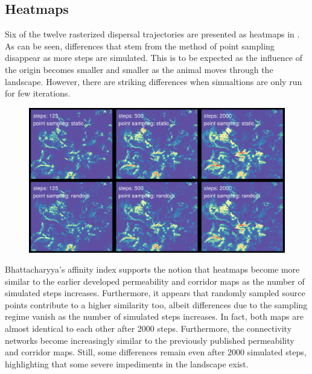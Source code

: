 \documentclass[abstract=on,10pt,a4paper,bibliography=totocnumbered]{article}
\begin{document}
\subsection{Heatmaps}
Six of the twelve rasterized dispersal trajectories are presented as heatmaps in
. As can be seen, differences that stem from the method of point
sampling disappear as more steps are simulated. This is to be expected as the
influence of the origin becomes smaller and smaller as the animal moves through
the landscape. However, there are striking differences when simualtions are only
run for few iterations.

\begin{figure}
  \includegraphics[width=\textwidth]{99_Heatmaps}
  \caption{}
  \label{Heatmaps}
\end{figure}

Bhattacharyya's affinity index supports the notion that heatmaps become more
similar to the earlier developed permeability and corridor maps as the number of
simulated steps increases. Furthermore, it appears that randomly sampled source
points contribute to a higher similarity too, albeit differences due to the
sampling regime vanish as the number of simulated steps increases. In fact, both
maps are almost identical to each other after 2000 steps. Furthermore, the
connectivity networks become increasingly similar to the previously published
permeability and corridor maps. Still, some differences remain even after 2000
simulated steps, highlighting that some severe impediments in the landscape
exist.
\end{document}
